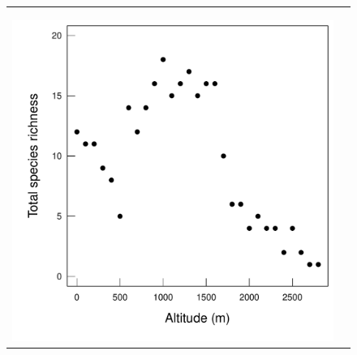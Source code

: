 \documentclass{article}\usepackage[]{graphicx}\usepackage[]{color}
\makeatletter
\newenvironment{kframe}{%
 \def\at@end@of@kframe{}%
 \ifinner\ifhmode%
  \def\at@end@of@kframe{\end{minipage}}%
  \begin{minipage}{\columnwidth}%
 \fi\fi%
 \def\FrameCommand##1{\hskip\@totalleftmargin \hskip-\fboxsep
 \colorbox{shadecolor}{##1}\hskip-\fboxsep
     \hskip-\linewidth \hskip-\@totalleftmargin \hskip\columnwidth}%
 \MakeFramed {\advance\hsize-\width
   \@totalleftmargin\z@ \linewidth\hsize
   \@setminipage}}%
 {\par\unskip\endMakeFramed%
 \at@end@of@kframe}
\newenvironment{knitrout}{}{} %
\makeatother
\begin{document}
{\begin{figure}
\begin{tabular}{cc}
\begin{knitrout}
\begin{kframe}
{\ttfamily\noindent\bfseries\color{errorcolor}{\#\# Error in array(np, 1): 'data' doit être de type vecteur, il était 'NULL'}}

{\ttfamily\noindent\bfseries\color{errorcolor}{\#\# Error in array(np, 1): 'data' doit être de type vecteur, il était 'NULL'}}

{\ttfamily\noindent\bfseries\color{errorcolor}{\#\# Error in eval(expr, envir, enclos): objet 'fit' introuvable}}

{\ttfamily\noindent\bfseries\color{errorcolor}{\#\# Error in eval(expr, envir, enclos): objet 'fit' introuvable}}

{\ttfamily\noindent\bfseries\color{errorcolor}{\#\# Error in eval(expr, envir, enclos): objet 'ucl' introuvable}}

{\ttfamily\noindent\bfseries\color{errorcolor}{\#\# Error in xy.coords(x, y): objet 'y.polygon' introuvable}}

{\ttfamily\noindent\bfseries\color{errorcolor}{\#\# Error in xy.coords(x, y): objet 'fit' introuvable}}

{\ttfamily\noindent\color{warningcolor}{\#\# Warning in rm(i.back, i.for, lcl, ucl, se, fit): objet 'lcl' introuvable}}

{\ttfamily\noindent\color{warningcolor}{\#\# Warning in rm(i.back, i.for, lcl, ucl, se, fit): objet 'ucl' introuvable}}

{\ttfamily\noindent\color{warningcolor}{\#\# Warning in rm(i.back, i.for, lcl, ucl, se, fit): objet 'se' introuvable}}

{\ttfamily\noindent\color{warningcolor}{\#\# Warning in rm(i.back, i.for, lcl, ucl, se, fit): objet 'fit' introuvable}}\end{kframe}

{\centering \includegraphics[width=0.5\linewidth]{figures/zoizos-Stot-1} 

}




\end{knitrout}
\end{tabular}
\end{figure}}
\end{document}
